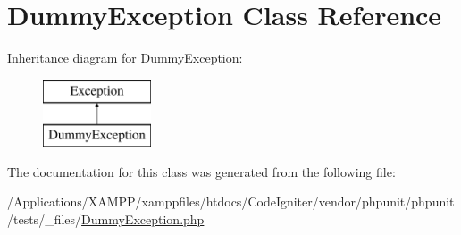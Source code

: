 \hypertarget{class_dummy_exception}{}\section{Dummy\+Exception Class Reference}
\label{class_dummy_exception}
Inheritance diagram for Dummy\+Exception\+:\begin{figure}[H]
\begin{center}
\leavevmode
\includegraphics[height=2.000000cm]{class_dummy_exception}
\end{center}
\end{figure}


The documentation for this class was generated from the following file\+:\begin{DoxyCompactItemize}
\item 
/\+Applications/\+X\+A\+M\+P\+P/xamppfiles/htdocs/\+Code\+Igniter/vendor/phpunit/phpunit/tests/\+\_\+files/\mbox{\hyperlink{_dummy_exception_8php}{Dummy\+Exception.\+php}}\end{DoxyCompactItemize}
